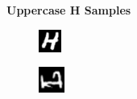 \documentclass[conference]{IEEEtran}
\begin{document}
\begin{figure}[h]
\begin{subfigure}{.10\textwidth}
        \label{fig:issue_F04}
    \end{subfigure}\par\medskip
    \textbf{Uppercase H Samples}\par\medskip
    \begin{subfigure}{.10\textwidth}
        \centering
        \includegraphics[width=.90\textwidth]{./images/issues/H-0.png}
        \label{fig:issue_H0}
    \end{subfigure}%
    \begin{subfigure}{.10\textwidth}
        \centering
        \includegraphics[width=.90\textwidth]{./images/issues/H-02.png}

\end{subfigure}
\end{figure}
\end{document}
